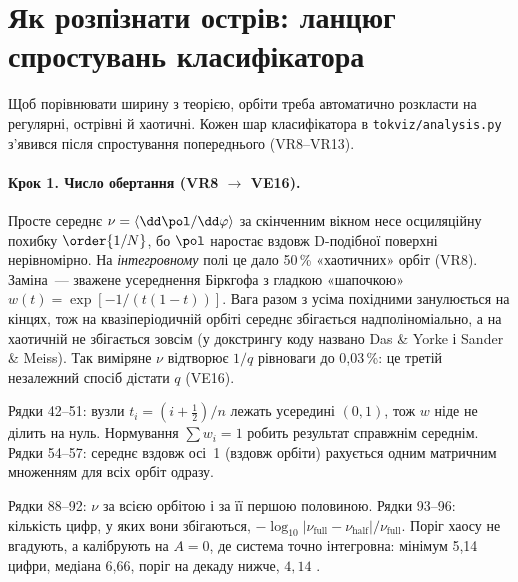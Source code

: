 \section{Як розпізнати острів: ланцюг спростувань класифікатора}\label{sec:g08-classifier}

Щоб порівнювати ширину з теорією, орбіти треба автоматично розкласти на регулярні, острівні
й хаотичні. Кожен шар класифікатора в \texttt{tokviz/analysis.py} з'явився після спростування
попереднього (VR8--VR13).

\paragraph{Крок 1. Число обертання (VR8 $\to$ VE16).} Просте середнє
$\nu=\langle\dd\pol/\dd\varphi\rangle$ за скінченним вікном несе осциляційну похибку
$\order{1/N}$, бо $\pol$ наростає вздовж D-подібної поверхні нерівномірно. На
\emph{інтегровному} полі це дало 50\,\% «хаотичних» орбіт (VR8). Заміна~--- зважене усереднення
Біркгофа з гладкою «шапочкою» $w(t)=\exp[-1/(t(1-t))]$. Вага разом з усіма похідними
занулюється на кінцях, тож на квазіперіодичній орбіті середнє збігається надполіноміально, а на
хаотичній не збігається зовсім (у докстрингу коду названо Das \& Yorke і Sander \& Meiss).
Так виміряне $\nu$ відтворює $1/q$ рівноваги до 0,03\,\%: це третій незалежний спосіб
дістати $q$ (VE16).


Рядки 42--51: вузли $t_i=(i+\frac12)/n$ лежать усередині $(0,1)$, тож $w$ ніде не ділить на
нуль. Нормування $\sum w_i=1$ робить результат справжнім середнім. Рядки 54--57: середнє вздовж
осі~1 (вздовж орбіти) рахується одним матричним множенням для всіх орбіт одразу.


Рядки 88--92: $\nu$ за всією орбітою і за її першою половиною. Рядки 93--96: кількість
цифр, у яких вони збігаються, $-\log_{10}|\nu_{\text{full}}-\nu_{\text{half}}|/\nu_{\text{full}}$.
Поріг хаосу не вгадують, а калібрують на $A=0$, де система точно інтегровна: мінімум
5,14 цифри, медіана 6,66, поріг на декаду нижче, $4{,}14$ \cite{g08Analysis}.

